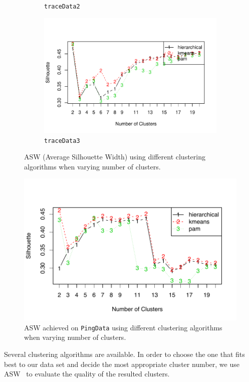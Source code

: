 \begin{figure}[!htb]
\begin{subfigure}[b]{.7\textwidth}
	\caption{\scriptsize \texttt{traceData2}}
	\label{fig:traceSil2}
	\end{subfigure}
	\begin{subfigure}[b]{.7\textwidth}
	\includegraphics[width=\textwidth]{gfx/chap3/traceSil3.pdf}
	\caption{\scriptsize \texttt{traceData3}}
	\label{fig:traceSil3}
	\end{subfigure}
\caption{ASW (Average Silhouette Width) using different clustering algorithms when varying number of clusters.}
\label{fig:sil}
\end{figure}
\fi

\begin{figure}[!htb]
\centering
\includegraphics[width=.9\textwidth]{gfx/chap3/pingSil.pdf}
\caption{\ac{ASW} achieved on \texttt{PingData} using different clustering algorithms when varying number of clusters.}
\label{fig:pingSil}
\end{figure}

Several clustering algorithms are available. 
In order to choose the one that fits best to our data set and decide the most appropriate cluster number, we use \acf{ASW}~\cite{Rousseeuw1987} to evaluate the quality of the resulted clusters.

